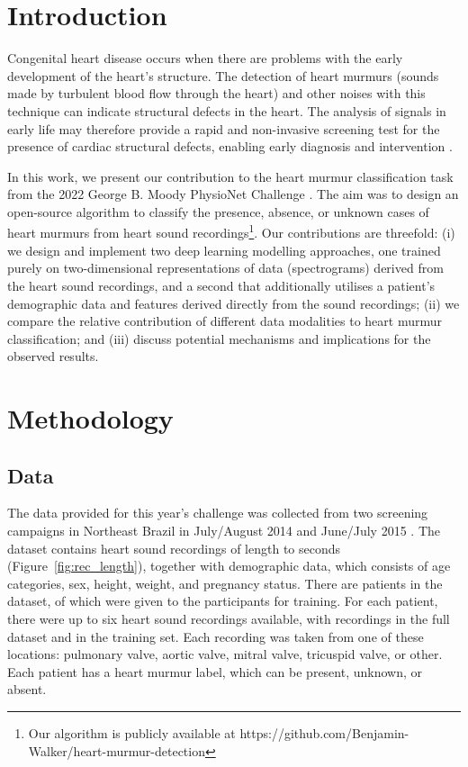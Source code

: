 \documentclass[twocolumn]{cinc}
\begin{document}
\section{Introduction} Congenital heart disease occurs when there are problems with the early development of the heart's structure. The detection of heart murmurs (sounds made by turbulent blood flow through the heart) and other noises with this technique can indicate structural defects in the heart. The analysis of signals in early life may therefore provide a rapid and non-invasive screening test for the presence of cardiac structural defects, enabling early diagnosis and intervention \cite{frank2011evaluation}. 





In this work, we present our contribution to the heart murmur classification task from the 2022 George B. Moody PhysioNet Challenge \cite{goldberger2000physiobank}. The aim was to design an open-source algorithm to classify the presence, absence, or unknown cases of heart murmurs from heart sound recordings\footnote{Our algorithm is publicly available at https://github.com/Benjamin-Walker/heart-murmur-detection}. Our contributions are threefold: (i) we design and implement two deep learning modelling approaches, one trained purely on two-dimensional representations of data (spectrograms) derived from the heart sound recordings, and a second that additionally utilises a patient's demographic data and features derived directly from the sound recordings; (ii) we compare the relative contribution of different data modalities to heart murmur classification; and 
(iii) discuss potential mechanisms and implications for the observed results.


\section{Methodology}

\subsection{Data}
The data provided for this year's challenge was collected from two screening campaigns in Northeast Brazil in July/August 2014 and June/July 2015 \cite{oliveira2021circor}. The dataset contains heart sound recordings of length  to  seconds (Figure~\ref{fig:rec_length}), together with demographic data, which consists of age categories, sex, height, weight, and pregnancy status. There are  patients in the dataset, of which   were given to the participants for training. For each patient, there were up to six heart sound recordings available, with  recordings in the full dataset and  in the training set. Each recording was taken from one of these locations: pulmonary valve, aortic valve, mitral valve, tricuspid valve, or other. Each patient has a heart murmur label, which can be present, unknown, or absent.
\end{document}

